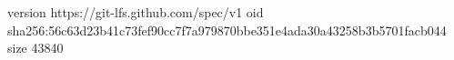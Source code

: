 version https://git-lfs.github.com/spec/v1
oid sha256:56c63d23b41c73fef90cc7f7a979870bbe351e4ada30a43258b3b5701facb044
size 43840

